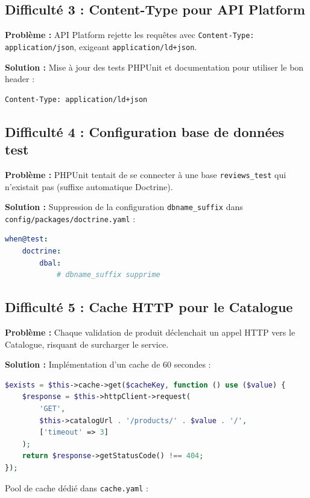 \documentclass[11pt,a4paper]{article}
\begin{document}
\subsection{Difficulté 3 : Content-Type pour API Platform}

\textbf{Problème :} API Platform rejette les requêtes avec \texttt{Content-Type: application/json}, exigeant \texttt{application/ld+json}.

\textbf{Solution :} Mise à jour des tests PHPUnit et documentation pour utiliser le bon header :

\begin{lstlisting}
Content-Type: application/ld+json
\end{lstlisting}

\subsection{Difficulté 4 : Configuration base de données test}

\textbf{Problème :} PHPUnit tentait de se connecter à une base \texttt{reviews\_test} qui n'existait pas (suffixe automatique Doctrine).

\textbf{Solution :} Suppression de la configuration \texttt{dbname\_suffix} dans \texttt{config/packages/doctrine.yaml} :

\begin{lstlisting}[language=YAML]
when@test:
    doctrine:
        dbal:
            # dbname_suffix supprime
\end{lstlisting}

\subsection{Difficulté 5 : Cache HTTP pour le Catalogue}

\textbf{Problème :} Chaque validation de produit déclenchait un appel HTTP vers le Catalogue, risquant de surcharger le service.

\textbf{Solution :} Implémentation d'un cache de 60 secondes :

\begin{lstlisting}[language=PHP]
$exists = $this->cache->get($cacheKey, function () use ($value) {
    $response = $this->httpClient->request(
        'GET',
        $this->catalogUrl . '/products/' . $value . '/',
        ['timeout' => 3]
    );
    return $response->getStatusCode() !== 404;
});
\end{lstlisting}

Pool de cache dédié dans \texttt{cache.yaml} :
\end{document}
